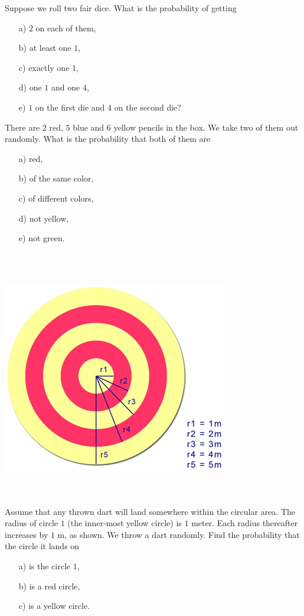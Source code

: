 \medskip



\begin{problem}
Suppose we roll two fair dice. What is the probability of getting
\begin{enumerate}
    \item[a) ] $2$ on each of them,
    \item[b) ] at least one $1$,
    \item[c) ] exactly one $1$,
    \item[d) ] one $1$ and one $4$,
    \item[e) ] $1$ on the first die and $4$ on the second die?
\end{enumerate}
\end{problem}
\medskip

\begin{problem}
There are $2$ red, $5$ blue and $6$ yellow pencils in the box. We take two of them out randomly. What is the probability that both of them are
\begin{enumerate}
    \item[a) ] red,
    \item[b) ] of the same color,
    \item[c) ] of different colors,
    \item[d) ] not yellow,
    \item[e) ] not green.
\end{enumerate}
\end{problem}

\medskip

\begin{problem}
     \\~\\
\begin{center}
\includegraphics[width=0.5\linewidth]{figs/prob1.png}
\end{center}
\\~\\
Assume that any thrown dart will land somewhere within the circular area. The radius of circle $1$ (the inner-most yellow circle) is $1$ meter. Each radius thereafter increases by $1$ m, as shown. We throw a dart randomly. Find the probability that the circle it lands on
\begin{enumerate}
    \item[a) ] is the circle $1$,
    \item[b) ] is a red circle,
    \item[c) ] is a yellow circle.
    
\end{enumerate}
\end{problem}


